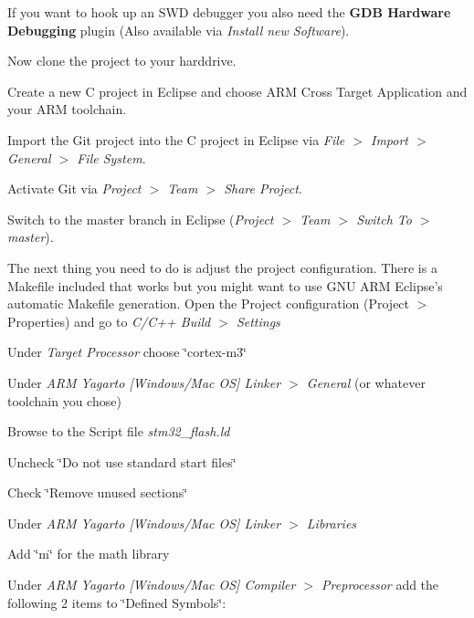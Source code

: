 \begin{DoxyItemize}
\begin{DoxyItemize}
\begin{DoxyItemize}
\end{DoxyItemize}
\item If you want to hook up an S\+W\+D debugger you also need the {\bfseries G\+D\+B Hardware Debugging} plugin (Also available via {\itshape Install new Software}).
\end{DoxyItemize}
\item Now clone the project to your harddrive.
\item Create a new C project in Eclipse and choose A\+R\+M Cross Target Application and your A\+R\+M toolchain.
\item Import the Git project into the C project in Eclipse via {\itshape File $>$ Import $>$ General $>$ File System}.
\item Activate Git via {\itshape Project $>$ Team $>$ Share Project}.
\item Switch to the master branch in Eclipse ({\itshape Project $>$ Team $>$ Switch To $>$ master}).
\item The next thing you need to do is adjust the project configuration. There is a Makefile included that works but you might want to use G\+N\+U A\+R\+M Eclipse's automatic Makefile generation. Open the Project configuration (Project $>$ Properties) and go to {\itshape C/\+C++ Build $>$ Settings}
\begin{DoxyItemize}
\item Under {\itshape Target Processor} choose \char`\"{}cortex-\/m3\char`\"{}
\item Under {\itshape A\+R\+M Yagarto \mbox{[}Windows/\+Mac O\+S\mbox{]} Linker $>$ General} (or whatever toolchain you chose)
\begin{DoxyItemize}
\item Browse to the Script file {\itshape stm32\+\_\+flash.\+ld}
\item Uncheck \char`\"{}\+Do not use standard start files\char`\"{}
\item Check \char`\"{}\+Remove unused sections\char`\"{}
\end{DoxyItemize}
\item Under {\itshape A\+R\+M Yagarto \mbox{[}Windows/\+Mac O\+S\mbox{]} Linker $>$ Libraries}
\begin{DoxyItemize}
\item Add \char`\"{}m\char`\"{} for the math library
\end{DoxyItemize}
\item Under {\itshape A\+R\+M Yagarto \mbox{[}Windows/\+Mac O\+S\mbox{]} Compiler $>$ Preprocessor} add the following 2 items to \char`\"{}\+Defined Symbols\char`\"{}\+:

\end{DoxyItemize}
\end{DoxyItemize}
